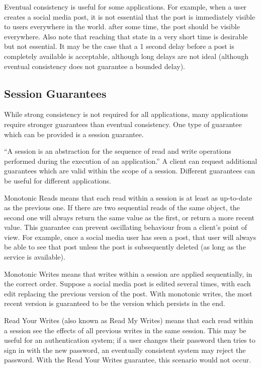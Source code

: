 \documentclass[12pt,a4paper,twoside,openany]{report}
\begin{document}
Eventual consistency is useful for some applications. For example, when a user creates a social media post, it is not essential that the post is immediately visible to users everywhere in the world. after some time, the post should be visible everywhere. Also note that reaching that state in a very short time is desirable but not essential. It may be the case that a 1 second delay before a post is completely available is acceptable, although long delays are not ideal (although eventual consistency does not guarantee a bounded delay).

\subsection*{Session Guarantees}

While strong consistency is not required for all applications, many applications require stronger guarantees than eventual consistency. One type of guarantee which can be provided is a session guarantee.

``A session is an abstraction for the sequence of read and write operations performed during the execution of an application.'' \cite{terry1994} A client can request additional guarantees which are valid within the scope of a session. Different guarantees can be useful for different applications.

\begin{description}
\item{Monotonic Reads} means that each read within a session is at least as up-to-date as the previous one. If there are two sequential reads of the same object, the second one will always return the same value as the first, or return a more recent value. This guarantee can prevent oscillating behaviour from a client's point of view. For example, once a social media user has seen a post, that user will always be able to see that post unless the post is subsequently deleted (as long as the service is available).

\item{Monotonic Writes} means that writes within a session are applied sequentially, in the correct order. Suppose a social media post is edited several times, with each edit replacing the previous version of the post. With monotonic writes, the most recent version is guaranteed to be the version which persists in the end.

\item{Read Your Writes} (also known as Read My Writes) means that each read within a session see the effects of all previous writes in the same session. This may be useful for an authentication system; if a user changes their password then tries to sign in with the new password, an eventually consistent system may reject the password. With the Read Your Writes guarantee, this scenario would not occur.

\end{description}
\end{document}
